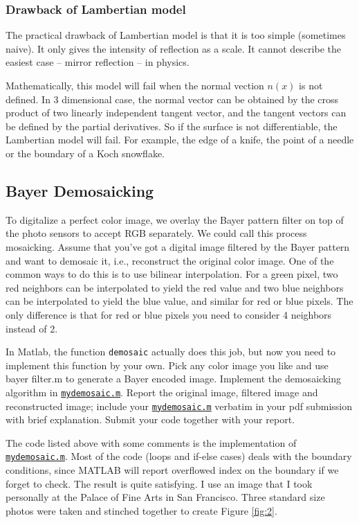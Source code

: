 \subsubsection{Drawback of Lambertian model}
The practical drawback of Lambertian model is that it is too simple (sometimes naive).
It only gives the intensity of reflection as a scale.
It cannot describe the easiest case -- mirror reflection -- in physics.

Mathematically, this model will fail when the normal vection \(n(x)\) is not defined.
In 3 dimensional case, the normal vector can be obtained by the cross product of two linearly independent tangent vector, and the tangent vectors can be defined by the partial derivatives.
So if the surface is not differentiable, the Lambertian model will fail.
For example, the edge of a knife, the point of a needle or the boundary of a Koch snowflake.




\subsection{Bayer Demosaicking}
To digitalize a perfect color image, we overlay the Bayer pattern filter on top of the photo sensors to accept RGB separately.
We could call this process mosaicking.
Assume that you've got a digital image filtered by the Bayer pattern and want to demosaic it, i.e., reconstruct the original color image.
One of the common ways to do this is to use bilinear interpolation.
For a green pixel, two red neighbors can be interpolated to yield the red value and two blue neighbors can be interpolated to yield the blue value, and similar for red or blue pixels.
The only difference is that for red or blue pixels you need to consider 4 neighbors instead of 2.

In Matlab, the function \texttt{demosaic} actually does this job, but now you need to implement this function by your own.
Pick any color image you like and use bayer filter.m to generate a Bayer encoded image.
Implement the demosaicking algorithm in \href{./hw1/problem3/mydemosaic.m}{\texttt{mydemosaic.m}}.
Report the original image, filtered image and reconstructed image; include your \href{./hw1/problem3/mydemosaic.m}{\texttt{mydemosaic.m}} verbatim in your pdf submission with brief explanation.
Submit your code together with your report.



The code listed above with some comments is the implementation of \href{./hw1/problem3/mydemosaic.m}{\texttt{mydemosaic.m}}.
Most of the code (loops and if-else cases) deals with the boundary conditions, since MATLAB will report overflowed index on the boundary if we forget to check.
The result is quite satisfying.
I use an image that I took personally at the Palace of Fine Arts in San Francisco.
Three standard size photos were taken and stinched together to create Figure \ref{fig:2}.



